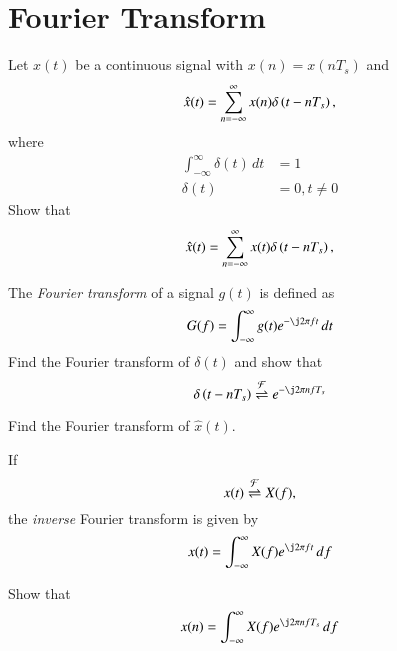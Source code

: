 \documentclass[journal,12pt,twocolumn]{IEEEtran}
\begin{document}
\section{Fourier Transform}
\begin{problem}
Let $x(t)$ be a continuous signal with $x(n) = x(nT_s)$ and
\begin{equation}
\hat{x}(t) = \sum_{n=-\infty}^{\infty}x(n)\delta\left(t-nT_s\right),
\end{equation}
where
\begin{align}
\int_{-\infty}^{\infty}\delta(t) \, dt &= 1
\\
\delta(t) &=0, t \ne 0
\end{align}
%
Show that
\begin{equation}
\hat{x}(t) = \sum_{n=-\infty}^{\infty}x(t)\delta\left(t-nT_s\right),
\end{equation}
\end{problem}
\begin{problem}
The {\em Fourier transform} of a signal $g(t)$ is defined as
\begin{equation}
G(f) = \int_{-\infty}^{\infty}g(t)e^{-\j 2\pi f t}\, dt
\end{equation}
%
Find the Fourier transform of $\delta(t)$ and show that 
\begin{equation}
\delta\brak{t-nT_s} \fourier e^{-\j2\pi nf T_s}
\end{equation}
\end{problem}
\begin{problem}
Find the Fourier transform of $\hat{x}(t)$.
\end{problem}
\begin{problem}
If
\begin{equation}
x(t) \overset{\mathcal{F}}{ \rightleftharpoons} X(f),
\end{equation}
the {\em inverse} Fourier transform is given by
\begin{equation}
\label{eq:inv_ft}
x(t) = \int_{-\infty}^{\infty}X(f)e^{\j 2\pi ft}\, df
\end{equation}

Show that 
\begin{equation}
\label{eq:ft}
x(n) = \int_{-\infty}^{\infty}X(f)e^{\j 2\pi n fT_s}\, df
\end{equation}
\end{problem}
\end{document}
